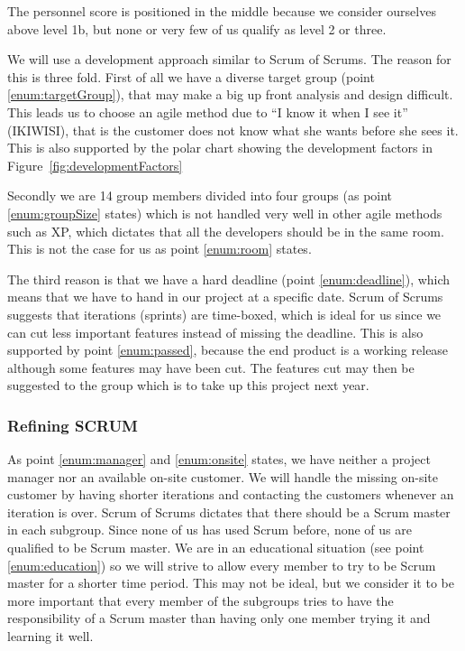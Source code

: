 The personnel score is positioned in the middle because we consider ourselves above level 1b, but none or very few of us qualify as level 2 or three.


We will use a development approach similar to Scrum of Scrums.
The reason for this is three fold.
First of all we have a diverse target group (point \ref{enum:targetGroup}), that may make a big up front analysis and design difficult.
This leads us to choose an agile method due to ``I know it when I see it'' (IKIWISI), that is the customer does not know what she wants before she sees it.
This is also supported by the polar chart showing the development factors in Figure~\ref{fig:developmentFactors}

Secondly we are 14 group members divided into four groups (as point \ref{enum:groupSize} states) which is not handled very well in other agile methods such as XP, which dictates that all the developers should be in the same room. 
This is not the case for us as point \ref{enum:room} states.

The third reason is that we have a hard deadline (point \ref{enum:deadline}), which means that we have to hand in our project at a specific date.
Scrum of Scrums suggests that iterations (sprints) are time-boxed, which is ideal for us since we can cut less important features instead of missing the deadline.
This is also supported by point \ref{enum:passed}, because the end product is a working release although some features may have been cut.
The features cut may then be suggested to the group which is to take up this project next year.


\subsubsection{Refining SCRUM}
As point \ref{enum:manager} and \ref{enum:onsite} states, we have neither a project manager nor an available on-site customer.
We will handle the missing on-site customer by having shorter iterations and contacting the customers whenever an iteration is over.
Scrum of Scrums dictates that there should be a Scrum master in each subgroup.
Since none of us has used Scrum before, none of us are qualified to be Scrum master.
We are in an educational situation (see point \ref{enum:education}) so we will strive to allow every member to try to be Scrum master for a shorter time period.
This may not be ideal, but we consider it to be more important that every member of the subgroups tries to have the responsibility of a Scrum master than having only one member trying it and learning it well.

